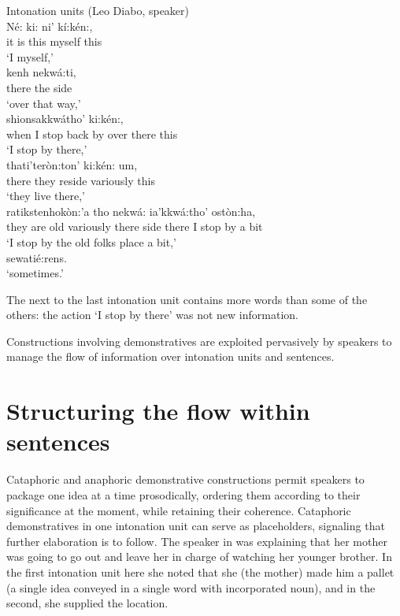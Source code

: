 \documentclass[output=paper,colorlinks,citecolor=brown]{langscibook}
\begin{document}
\ea Intonation units (Leo Diabo, speaker)\\\label{ex:mithun:7}
\gll  Né:     ki: ni' kí:kén:,\\
     {it is} this myself this\\
\glt `I myself,'\medskip\\
\gll kenh nekwá:ti,\\
     there {the side}\\
\glt `over that way,'\medskip\\
\gll shionsakkwátho' ki:kén:,\\
     {when I stop back by over there} this\\
\glt `I stop by there,'\medskip\\
\gll thati'teròn:ton' {ki:kén: um,}\\
     {there they reside variously} this\\
\glt `they live there,'\medskip\\
\gll ratikstenhokòn:'a tho nekwá: ia'kkwá:tho' ostòn:ha,\\
     {they are old variously} there side {there I stop by} {a bit}\\
\glt `I stop by the old folks place a bit,'\medskip\\
sewatié:rens.\\
\glt `sometimes.'
\z

The next to the last intonation unit contains more words than some of the others: the action `I stop by there' was not new information. 

Constructions involving demonstratives are exploited pervasively by speakers to manage the flow of information over intonation units and sentences.

\section{Structuring the flow within sentences}

Cataphoric and anaphoric demonstrative constructions permit speakers to package one idea at a time prosodically, ordering them according to their significance at the moment, while retaining their coherence. Cataphoric demonstratives in one intonation unit can serve as placeholders, signaling that further elaboration is to follow. The speaker in  was explaining that her mother was going to go out and leave her in charge of watching her younger brother. In the first intonation unit here she noted that she (the mother) made him a pallet (a single idea conveyed in a single word with incorporated noun), and in the second, she supplied the location.
\end{document}
